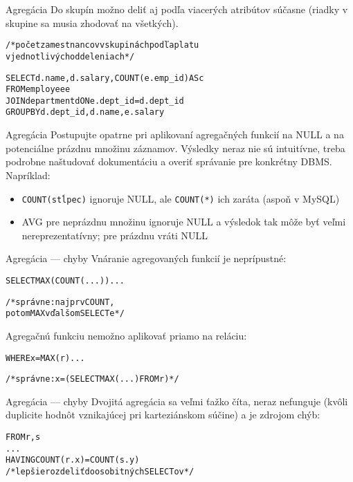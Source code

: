 \documentclass[12pt]{beamer}
\begin{document}
\begin{frame}[fragile]{Agregácia}
Do skupín možno deliť aj podľa viacerých atribútov súčasne (riadky v skupine sa musia zhodovať na všetkých).
\begin{alltt}
/* počet zamestnancov v skupinách podľa platu
v jednotlivých oddeleniach */

SELECT d.name, d.salary, \alert{COUNT}(e.emp_id) AS c
FROM employee e
    JOIN department d ON e.dept_id = d.dept_id
\alert{GROUP BY} d.dept_id, d.name, e.salary
\end{alltt}
\end{frame}

\begin{frame}[fragile]{Agregácia}
Postupujte opatrne pri aplikovaní agregačných funkcií na NULL a na potenciálne prázdnu množinu záznamov.
Výsledky neraz nie sú intuitívne, treba podrobne naštudovať dokumentáciu a overiť správanie pre konkrétny DBMS.
Napríklad:
\begin{itemize}
\item \verb|COUNT(stĺpec)| ignoruje NULL, ale \verb|COUNT(*)| ich zaráta (aspoň v MySQL)
\item AVG pre neprázdnu množinu ignoruje NULL a výsledok tak môže byť veľmi nereprezentatívny; pre prázdnu vráti NULL
\end{itemize}
\end{frame}

\begin{frame}[fragile]{Agregácia --- chyby}
Vnáranie agregovaných funkcií je neprípustné:
\begin{alltt}
SELECT \alert{MAX(COUNT(...))} ...

/* správne: najprv COUNT,
   potom MAX v ďalšom SELECTe */
\end{alltt}
\vspace{10mm}
Agregačnú funkciu nemožno aplikovať priamo na reláciu:
\begin{alltt}
WHERE x = \alert{MAX(r)} ...

/* správne: x = (SELECT MAX(...) FROM r) */
\end{alltt}
\end{frame}

\begin{frame}[fragile]{Agregácia --- chyby}
Dvojitá agregácia sa veľmi ťažko číta, neraz nefunguje (kvôli duplicite hodnôt vznikajúcej pri karteziánskom súčine) a je zdrojom chýb:
\begin{alltt}
FROM r, s
...
HAVING COUNT(r.x) = COUNT(s.y)
/* lepšie rozdeliť do osobitných SELECTov */
\end{alltt}
\end{frame}
\end{document}
